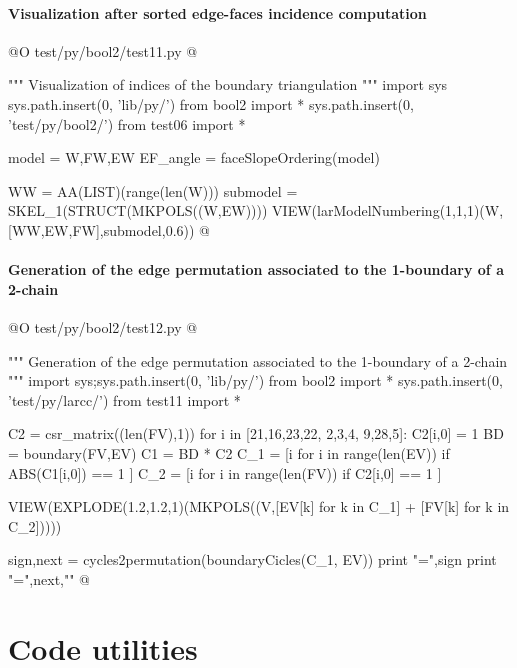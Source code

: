 \documentclass[11pt,oneside]{article}    %
\begin{document}
\paragraph{Visualization after sorted edge-faces incidence computation}

@O test/py/bool2/test11.py @{
""" Visualization of indices of the boundary triangulation """
import sys
sys.path.insert(0, 'lib/py/')
from bool2 import *
sys.path.insert(0, 'test/py/bool2/')
from test06 import *

model = W,FW,EW
EF_angle = faceSlopeOrdering(model)

WW = AA(LIST)(range(len(W)))
submodel = SKEL_1(STRUCT(MKPOLS((W,EW))))
VIEW(larModelNumbering(1,1,1)(W,[WW,EW,FW],submodel,0.6))
@}



\paragraph{Generation of the edge permutation associated to the 1-boundary of a 2-chain}

@O test/py/bool2/test12.py @{
""" Generation of the edge permutation associated to the 1-boundary of a 2-chain """
import sys;sys.path.insert(0, 'lib/py/')
from bool2 import *
sys.path.insert(0, 'test/py/larcc/')
from test11 import *

C2 = csr_matrix((len(FV),1))
for i in [21,16,23,22, 2,3,4, 9,28,5]: C2[i,0] = 1
BD = boundary(FV,EV)
C1 = BD * C2
C_1 = [i for i in range(len(EV)) if ABS(C1[i,0]) == 1 ]
C_2 = [i for i in range(len(FV)) if C2[i,0] == 1 ]

VIEW(EXPLODE(1.2,1.2,1)(MKPOLS((V,[EV[k] for k in C_1] + [FV[k] for k in C_2]))))

sign,next = cycles2permutation(boundaryCicles(C_1, EV))
print "\nsign =",sign
print "\nnext =",next,"\n"
@}




\appendix
\section{Code utilities}
\end{document}
